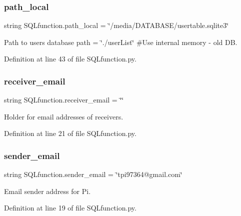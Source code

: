 \mbox{\label{namespace_s_q_lfunction_a50744e6ca7c6cbd547746acb907f016e}} 
\subsubsection{path\+\_\+local}
{\footnotesize\ttfamily string S\+Q\+Lfunction.\+path\+\_\+local = \char`\"{}/media/D\+A\+T\+A\+B\+A\+SE/usertable.\+sqlite3\char`\"{}}



Path to users database path = \char`\"{}./user\+List\char`\"{} \#\+Use internal memory -\/ old DB. 



Definition at line 43 of file S\+Q\+Lfunction.\+py.

\mbox{\label{namespace_s_q_lfunction_a51ebdaf9d64f52b2c266a49020cf12a5}} 
\subsubsection{receiver\+\_\+email}
{\footnotesize\ttfamily string S\+Q\+Lfunction.\+receiver\+\_\+email = \char`\"{}\char`\"{}}



Holder for email addresses of receivers. 



Definition at line 21 of file S\+Q\+Lfunction.\+py.

\mbox{\label{namespace_s_q_lfunction_ac63d06248a3e41c104ae1290bb403c78}} 
\subsubsection{sender\+\_\+email}
{\footnotesize\ttfamily string S\+Q\+Lfunction.\+sender\+\_\+email = \char`\"{}tpi97364@gmail.\+com\char`\"{}}



Email sender address for Pi. 



Definition at line 19 of file S\+Q\+Lfunction.\+py.

\mbox{\label{namespace_s_q_lfunction_a0d308a95029254ed328ba365861abdf2}} 
